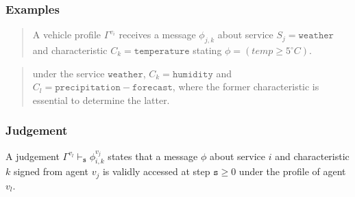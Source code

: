 \documentclass{beamer}
\begin{document}
\begin{frame}
	\label{error5}
	\frametitle{Examples}
	\smallskip


\begin{quote}
A vehicle profile $\Gamma^{v_{i}}$ receives a message $\phi_{j,k}$ about service $S_{j}=\mathtt{weather}$ and characteristic $C_{k}=\mathtt{temperature}$ stating $\phi= (temp \geq 5^\circ C)$.
\end{quote}

\begin{quote}
 under the service $\mathtt{weather}$, $C_{k}=\mathtt{humidity}$ and $C_{l}=\mathtt{precipitation-forecast}$, where the former characteristic is essential to determine the latter.
\end{quote}
\end{frame}


\begin{frame}
	\label{error5.1}
	\frametitle{Judgement}
	\smallskip


  \begin{definition}[Judgements]
  A judgement $\Gamma^{v_l} \vdash_{\mathtt{s}} \phi^{v_{j}}_{i,k}$ states that a message $\phi$ about service $i$ and characteristic $k$ signed from agent $v_{j}$  is validly accessed at step $\mathtt{s}\geq 0$ under the profile of agent $v_{l}$.
  \end{definition}

\end{frame}
\end{document}
